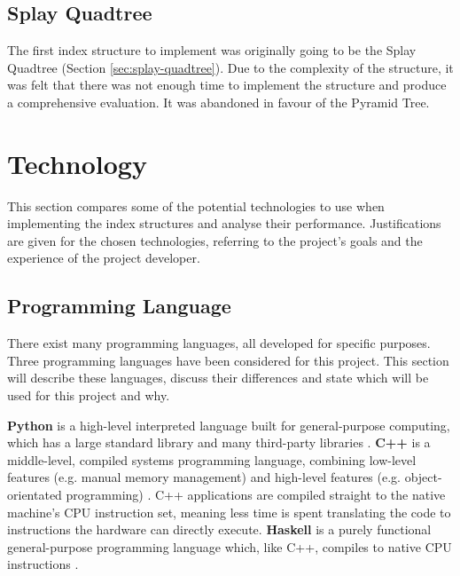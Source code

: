 \subsection{Splay Quadtree}

The first index structure to implement was originally going to be the Splay Quadtree (Section \ref{sec:splay-quadtree}). Due to the complexity of the structure, it was felt that there was not enough time to implement the structure and produce a comprehensive evaluation. It was abandoned in favour of the Pyramid Tree.

\section{Technology}

This section compares some of the potential technologies to use when implementing the index structures and analyse their performance. Justifications are given for the chosen technologies, referring to the project's goals and the experience of the project developer.

\subsection{Programming Language}

There exist many programming languages, all developed for specific purposes. Three programming languages have been considered for this project. This section will describe these languages, discuss their differences and state which will be used for this project and why.

\textbf{Python} is a high-level interpreted language built for general-purpose computing, which has a large standard library and many third-party libraries \cite{python}. \textbf{C++} is a middle-level, compiled systems programming language, combining low-level features (e.g. manual memory management) and high-level features (e.g. object-orientated programming) \cite{cpp}. C++ applications are compiled straight to the native machine's CPU instruction set, meaning less time is spent translating the code to instructions the hardware can directly execute. \textbf{Haskell} is a purely functional general-purpose programming language which, like C++, compiles to native CPU instructions \cite{haskell}.


